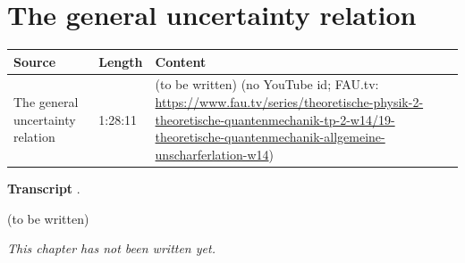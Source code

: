 \chapter{The general uncertainty relation}\label{ch:c19}
\begin{paracol}{2}

\begin{sources}
\begin{tabularx}{\linewidth}{@{}l l L@{}}
\toprule
\textbf{Source} & \textbf{Length} & \textbf{Content}\\
\midrule
The general uncertainty relation & 1:28:11 & (to be written) (no YouTube id; FAU.tv: \url{https://www.fau.tv/series/theoretische-physik-2-theoretische-quantenmechanik-tp-2-w14/19-theoretische-quantenmechanik-allgemeine-unscharferlation-w14})\\
\bottomrule
\end{tabularx}

\smallskip
\textbf{Transcript} .
\end{sources}

\begin{reading}
(to be written)
\end{reading}

\emph{This chapter has not been written yet.}

\flushside
\end{paracol}
